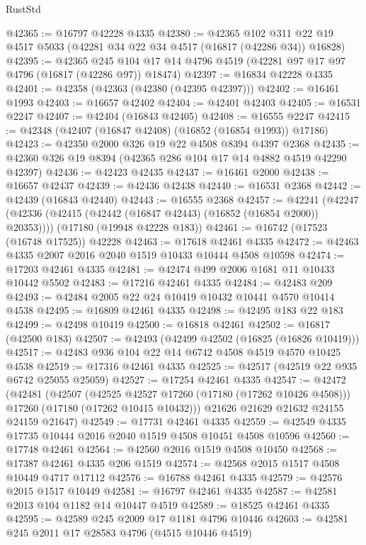 \begin{lexlean}{RustStd}
\begin{coremodule}
{\begin{coremodule}
{{{{{{{{{{{{{{{{{{{{{{{{{{{{{{{{{{{{{{{{{{{{{{{{{{{{{{{@42365 := @16797 @42228 @4335
@42380 := @42365
    @102
    @311
    @22
    @19
    @4517
    @5033
    (@42281 @34 @22 @34 @4517 (@16817 (@42286 @34)) @16828)
@42395 := @42365
    @245
    @104
    @17
    @14
    @4796
    @4519
    (@42281 @97 @17 @97 @4796 (@16817 (@42286 @97)) @18474)
@42397 := @16834 @42228 @4335
@42401 := @42358 (@42363 (@42380 (@42395 @42397)))
@42402 := @16461 @1993
@42403 := @16657 @42402
@42404 := @42401 @42403
@42405 := @16531 @2247
@42407 := @42404 (@16843 @42405)
@42408 := @16555 @2247
@42415 := @42348 (@42407 (@16847 @42408) (@16852 (@16854 @1993)) @17186)
@42423 := @42350 @2000 @326 @19 @22 @4508 @8394 @4397 @2368
@42435 := @42360 @326 @19 @8394 (@42365 @286 @104 @17 @14 @4882 @4519 @42290 @42397)
@42436 := @42423 @42435
@42437 := @16461 @2000
@42438 := @16657 @42437
@42439 := @42436 @42438
@42440 := @16531 @2368
@42442 := @42439 (@16843 @42440)
@42443 := @16555 @2368
@42457 := @42241
    (@42247 (@42336 (@42415 (@42442 (@16847 @42443) (@16852 (@16854 @2000)) @20353))))
    (@17180 (@19948 @42228 @183))
@42461 := @16742 (@17523 (@16748 @17525)) @42228
@42463 := @17618 @42461 @4335
@42472 := @42463 @4335 @2007 @2016 @2040 @1519 @10433 @10444 @4508 @10598
@42474 := @17203 @42461 @4335
@42481 := @42474 @499 @2006 @1681 @11 @10433 @10442 @5502
@42483 := @17216 @42461 @4335
@42484 := @42483 @209
@42493 := @42484 @2005 @22 @24 @10419 @10432 @10441 @4570 @10414 @4538
@42495 := @16809 @42461 @4335
@42498 := @42495 @183 @22 @183
@42499 := @42498 @10419
@42500 := @16818 @42461
@42502 := @16817 (@42500 @183)
@42507 := @42493 (@42499 @42502 (@16825 (@16826 @10419)))
@42517 := @42483 @936 @104 @22 @14 @6742 @4508 @4519 @4570 @10425 @4538
@42519 := @17316 @42461 @4335
@42525 := @42517 (@42519 @22 @935 @6742 @25055 @25059)
@42527 := @17254 @42461 @4335
@42547 := @42472
    (@42481
      (@42507
        (@42525 @42527 @17260 (@17180 (@17262 @10426 @4508)))
        @17260
        (@17180 (@17262 @10415 @10432)))
      @21626
      @21629
      @21632
      @24155
      @24159
      @21647)
@42549 := @17731 @42461 @4335
@42559 := @42549 @4335 @17735 @10444 @2016 @2040 @1519 @4508 @10451 @4508 @10596
@42560 := @17748 @42461
@42564 := @42560 @2016 @1519 @4508 @10450
@42568 := @17387 @42461 @4335 @206 @1519
@42574 := @42568 @2015 @1517 @4508 @10449 @4717 @17112
@42576 := @16788 @42461 @4335
@42579 := @42576 @2015 @1517 @10449
@42581 := @16797 @42461 @4335
@42587 := @42581 @2013 @104 @1182 @14 @10447 @4519
@42589 := @18525 @42461 @4335
@42595 := @42589 @245 @2009 @17 @1181 @4796 @10446
@42603 := @42581 @245 @2011 @17 @28583 @4796 (@4515 @10446 @4519)
}}}}}}}}}}}}}}}}}}}}}}}}}}}}}}}}}}}}}}}}}}}}}}}}}}}}}}}
\end{coremodule}}
\end{coremodule}
\end{lexlean}
